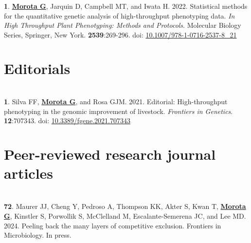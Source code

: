 \documentclass[margin,line,10pt]{res}
\newenvironment{list1}{
  \begin{list}{\ding{113}}{%
      \setlength{\itemsep}{0in}
      \setlength{\parsep}{0in} \setlength{\parskip}{0in}
      \setlength{\topsep}{0in} \setlength{\partopsep}{0in} 
      \setlength{\leftmargin}{0.17in}}}{\end{list}}
\begin{document}
\begin{resume}
\begin{list1}
\item  [{\bf 1}.] \textbf{\underline{Morota G}}, Jarquin D, Campbell MT, and Iwata H. 2022. Statistical methods for the quantitative genetic analysis of high-throughput phenotyping data. \emph{In High Throughput Plant Phenotyping: Methods and Protocols}. Molecular Biology Series, Springer, New York. \textbf{2539}:269-296. doi: \textcolor{blue}{\href{https://doi.org/10.1007/978-1-0716-2537-8_21}{10.1007/978-1-0716-2537-8\_21}}

\end{list1}


\vspace{0.5cm}
\section{\sc Editorials}
\vspace{1.0cm}

\section{}
\begin{list1}
\item [{\bf 1}.]  Silva FF, {\bf \underline{Morota G}}, and Rosa GJM. 2021. Editorial: High-throughput phenotyping in the genomic improvement of livestock. \emph{Frontiers in Genetics}. \textbf{12}:707343. doi: \textcolor{blue}{\href{https://doi.org/10.3389/fgene.2021.707343}{10.3389/fgene.2021.707343}}
\end{list1}



\section{\sc Peer-reviewed research journal articles}

\vspace{1.5cm}



\section{}
\begin{list1}


  \item  [{\bf 72}.] Maurer JJ, Cheng Y, Pedroso A, Thompson KK, Akter S, Kwan T, \textbf{\underline{Morota G}}, Kinstler S, Porwollik S, McClelland M, Escalante-Semerena JC, and Lee MD. 2024. Peeling back the many layers of competitive exclusion. Frontiers in Microbiology. In press.


\end{list1}
\end{resume}
\end{document}
